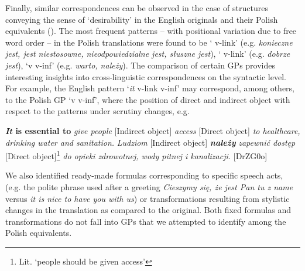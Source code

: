 \documentclass[output=paper]{langscibook}
\begin{document}
Finally, similar correspondences can be observed in the case of structures conveying the sense of ‘desirability’ in the English originals and their Polish equivalents (). The most frequent patterns -- with positional variation due to free word order -- in the Polish translations were found to be ‘{\ADJ} v-link’ (e.g. \textit{konieczne jest, jest niestosowne, nieodpowiedzialne jest, słuszne jest}), ‘{\ADV} v-link’ (e.g. \textit{dobrze jest}), ‘{\MOD}v v-inf’ (e.g. \textit{warto, należy}). The comparison of certain GPs provides interesting insights into cross-linguistic correspondences on the syntactic level. For example, the English pattern ‘\textit{it} v-link {\ADJ} v-inf’ may correspond, among others, to the Polish GP ‘{\MOD}v v-inf’, where the position of direct and indirect object with respect to the patterns under scrutiny changes, e.g. 

\ea \textbf{\textit{It} \textbf{is} \textbf{essential} \textbf{to}} \textit{give people} [Indirect object] \textit{access} [Direct object] \textit{to healthcare, drinking water and sanitation.} 
\ex\textit{Ludziom} [Indirect object] \textbf{\textit{należy}} \textit{zapewnić dostęp} [Direct object]\footnote{\textrm{Lit. ‘people should be given access’}} \textit{do opieki zdrowotnej, wody pitnej i kanalizacji.} [DrZG0o]
\z

We also identified ready-made formulas corresponding to specific speech acts, (e.g. the polite phrase used after a greeting \textit{Cieszymy się, że jest Pan tu z name} versus \textit{it is nice to have you with us}) or transformations resulting from stylistic changes in the translation as compared to the original. Both fixed formulas and transformations do not fall into GPs that we attempted to identify among the Polish equivalents.
\end{document}
